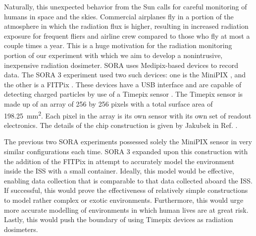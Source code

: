 Naturally, this unexpected behavior from the Sun calls for careful monitoring of humans in space and the skies.
Commercial airplanes fly in a portion of the atmosphere in which the radiation flux is higher, resulting in increased radiation exposure for frequent fliers and airline crew compared to those who fly at most a couple times a year. 
This is a huge motivation for the radiation monitoring portion of our experiment with which we aim to develop a nonintrusive, inexpensive radiation dosimeter.
SORA uses Medipix-based \cite{Medipix} devices to record data.
The SORA 3 experiment used two such devices: one is the MiniPIX \cite{MiniPIX-ADVACAM}, and the other is a FITPix \cite{FITPix}.
These devices have a USB interface and are capable of detecting charged particles by use of a Timepix sensor \cite{Timepix}.
The Timepix sensor is made up of an array of 256 by 256 pixels with a total surface area of \SI{198.25}{\milli\meter\squared}.
Each pixel in the array is its own sensor with its own set of readout electronics.
The details of the chip construction is given by Jakubek in Ref. \cite{Jakubek-Pixel-Detectors}.

The previous two SORA experiments possessed solely the MiniPIX sensor in very similar configurations each time.
SORA 3 expanded upon this construction with the addition of the FITPix in attempt to accurately model the environment inside the ISS with a small container.
Ideally, this model would be effective, enabling data collection that is comparable to that data collected aboard the ISS.
If successful, this would prove the effectiveness of relatively simple constructions to model rather complex or exotic environments.
Furthermore, this would urge more accurate modelling of environments in which human lives are at great risk.
Lastly, this would push the boundary of using Timepix devices as radiation dosimeters.


